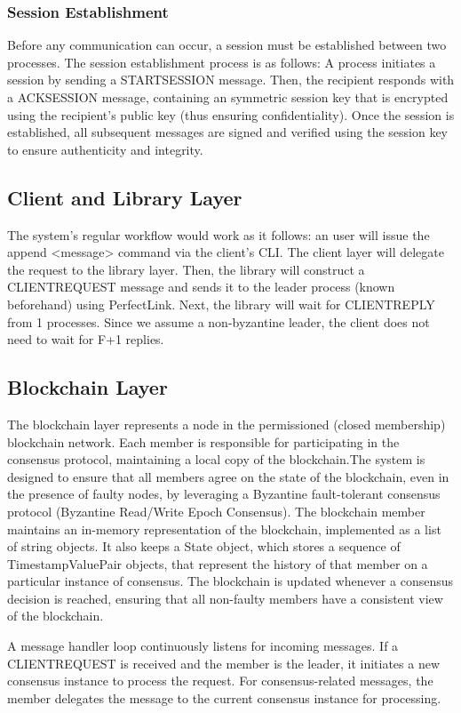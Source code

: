\documentclass[runningheads]{llncs}
\begin{document}
\subsubsection{Session Establishment}

Before any communication can occur, a session must be established between two
processes. The session establishment process is as follows: A process initiates
a session by sending a STARTSESSION message. Then, the recipient responds with a
ACKSESSION message, containing an symmetric session key that is encrypted using the recipient's public key (thus ensuring confidentiality). Once the session is
established, all subsequent messages are signed and verified using the session
key to ensure authenticity and integrity.
%
\subsection{Client and Library Layer}
The system's regular workflow would work as it follows: an user will issue the append <message> command via the client's CLI. The client
layer will delegate the request to the library layer. Then, the library will
construct a CLIENTREQUEST message and sends it to the leader process (known
beforehand) using PerfectLink. Next, the library will wait for CLIENTREPLY from
1 processes. Since we assume a non-byzantine leader, the client does not need to 
wait for F+1 replies.

%
\subsection{Blockchain Layer}
The blockchain layer represents a node in the permissioned (closed membership)
blockchain network. Each member is responsible for participating in the
consensus protocol, maintaining a local copy of the blockchain.The system is
designed to ensure that all members agree on the state of the blockchain, even
in the presence of faulty nodes, by leveraging a Byzantine fault-tolerant
consensus protocol (Byzantine Read/Write Epoch Consensus). The blockchain member
maintains an in-memory representation of the blockchain, implemented as a list of string objects.
It also keeps a State object, which stores a sequence of TimestampValuePair objects, that represent the 
history of that member on a particular instance of consensus.
The blockchain is updated whenever a consensus decision is reached, ensuring
that all non-faulty members have a consistent view of the blockchain.

A message handler loop continuously listens for incoming messages. If a
CLIENTREQUEST is received and the member is the leader, it initiates a new
consensus instance to process the request. For consensus-related messages, the
member delegates the message to the current consensus instance for processing.
\end{document}
